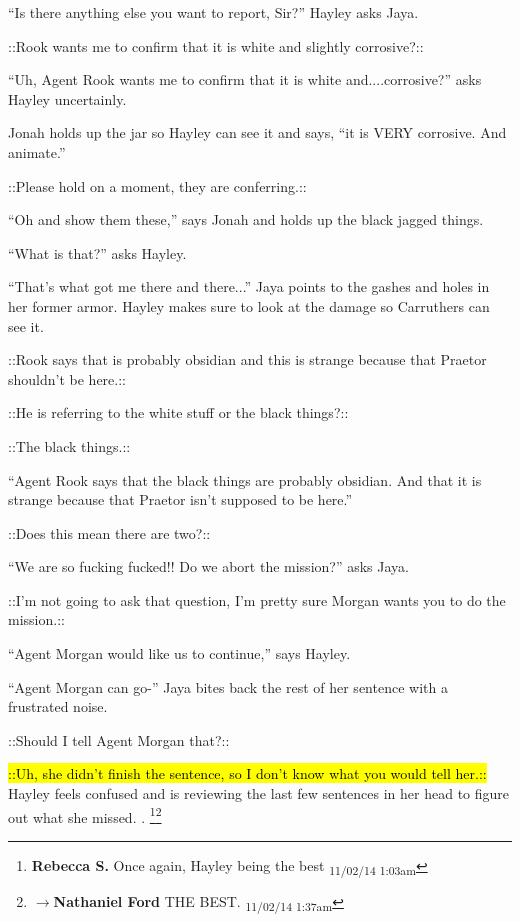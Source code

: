 ``Is there anything else you want to report, Sir?'' Hayley asks Jaya.

 {\color[RGB]{153,0,255}::Rook wants me to confirm that it is white and slightly corrosive?:: } 

``Uh, Agent Rook wants me to confirm that it is white and....corrosive?'' asks Hayley uncertainly.

Jonah holds up the jar so Hayley can see it and says, ``it is VERY corrosive.  And animate.''

 {\color[RGB]{153,0,255}::Please hold on a moment, they are conferring.::} 

``Oh and show them these,'' says Jonah and holds up the black jagged things.

``What is that?'' asks Hayley.

``That's what got me there and there...'' Jaya points to the gashes and holes in her former armor.  Hayley makes sure to look at the damage so Carruthers can see it.

 {\color[RGB]{153,0,255}::Rook says that is probably obsidian and this is strange because that Praetor shouldn't be here.::} 

 {\color[RGB]{230,145,56}::He is referring to the white stuff or the black things?::}  {\color[RGB]{255,153,0} } 

 {\color[RGB]{153,0,255}::The black things.::} 

``Agent Rook says that the black things are probably obsidian. And that it is strange because that Praetor isn't supposed to be here.''

 {\color[RGB]{230,145,56}::Does this mean there are two?::}  {\color[RGB]{255,153,0} } 

``We are so fucking fucked!!  Do we abort the mission?'' asks Jaya.

 {\color[RGB]{153,0,255}::I'm not going to ask that question, I'm pretty sure Morgan wants you to do the mission.::} 

``Agent Morgan would like us to continue,'' says Hayley.

``Agent Morgan can go-'' Jaya bites back the rest of her sentence with a frustrated noise.

 {\color[RGB]{153,0,255}::Should I tell Agent Morgan that?::} 

 {\color[RGB]{230,145,56}\hl{::Uh, she didn't finish the sentence, so I don't know what you would tell her.::}  {\color[RGB]{255,153,0}  } Hayley feels confused and is reviewing the last few sentences in her head to figure out what she missed. {\color[RGB]{255,153,0}.}} \footnote{\textbf{Rebecca S. }Once again, Hayley being the best \textsubscript{11/02/14 1:03am}}\footnote{$\rightarrow$\textbf{Nathaniel Ford }THE BEST. \textsubscript{11/02/14 1:37am}}

